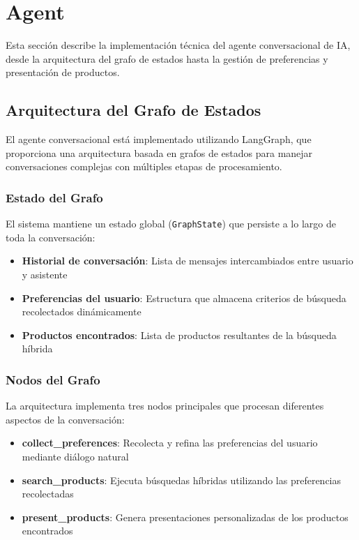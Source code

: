 \section{Agent}

Esta sección describe la implementación técnica del agente conversacional de IA, desde la arquitectura del grafo de estados hasta la gestión de preferencias y presentación de productos.

\subsection{Arquitectura del Grafo de Estados}

El agente conversacional está implementado utilizando LangGraph, que proporciona una arquitectura basada en grafos de estados para manejar conversaciones complejas con múltiples etapas de procesamiento.

\subsubsection{Estado del Grafo}

El sistema mantiene un estado global (\texttt{GraphState}) que persiste a lo largo de toda la conversación:

\begin{itemize}
    \item \textbf{Historial de conversación}: Lista de mensajes intercambiados entre usuario y asistente
    \item \textbf{Preferencias del usuario}: Estructura que almacena criterios de búsqueda recolectados dinámicamente
    \item \textbf{Productos encontrados}: Lista de productos resultantes de la búsqueda híbrida
\end{itemize}

\subsubsection{Nodos del Grafo}

La arquitectura implementa tres nodos principales que procesan diferentes aspectos de la conversación:

\begin{itemize}
    \item \textbf{collect\_preferences}: Recolecta y refina las preferencias del usuario mediante diálogo natural
    \item \textbf{search\_products}: Ejecuta búsquedas híbridas utilizando las preferencias recolectadas
    \item \textbf{present\_products}: Genera presentaciones personalizadas de los productos encontrados
\end{itemize}

